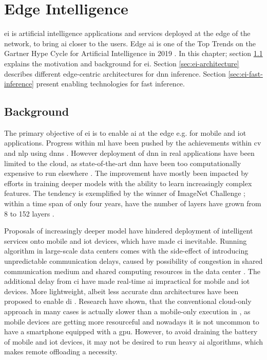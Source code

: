 \hypertarget{Edge Intelligence}{%
	\chapter{Edge Intelligence}\label{ch:edgeintelligence}}

\acrlong{ei} is artificial intelligence applications and services deployed at the edge of the network, to bring \gls{ai} closer to the users. Edge \gls{ai} is one of the Top Trends on the Gartner Hype Cycle for Artificial Intelligence in 2019 \cite{goasduff_top_2019}. In this chapter; section \ref{sec:ei-background} explains the motivation and background for \gls{ei}. Section \ref{sec:ei-architecture} describes different edge-centric architectures for \gls{dnn} inference. Section \ref{sec:ei-fast-inference} present enabling technologies for fast inference.

\section{Background}\label{sec:ei-background}

The primary objective of \gls{ei} is to enable \gls{ai} at the edge e.g. for mobile and \gls{iot} applications. Progress within \gls{ml} have been pushed by the achievements within \gls{cv} and \gls{nlp} using \gls{dnn}s \cite{stoica_berkeley_2017}. However deployment of \gls{dnn} in real applications have been limited to the cloud, as state-of-the-art \gls{dnn} have been too computationally expensive to run elsewhere \cite{zhou_edge_2019}. The improvement have mostly been impacted by efforts in training deeper models with the ability to learn increasingly complex features. The tendency is exemplified by the winner of ImageNet Challenge ; within a time span of only four years, have the number of layers have grown from 8 to 152 layers \cite{russakovsky_imagenet_2015}. 

Proposals of increasingly deeper model have hindered deployment of intelligent services onto mobile and \gls{iot} devices, which have made \gls{ci} inevitable. Running algorithm in large-scale data centers comes with the side-effect of introducing unpredictable communication delays, caused by possibility of congestion in shared communication medium and shared computing resources in the data center \cite{shi_edge_2016}. The additional delay from \gls{ci} have made real-time \gls{ai} impractical for mobile and \gls{iot} devices. More lightweight, albeit less accurate \gls{dnn} architectures have been proposed to enable \gls{di} \cite{chen_deep_2019}. Research have shown, that the conventional cloud-only approach in many cases is actually slower than a mobile-only execution in \cite{kang_neurosurgeon:_2017}, as mobile devices are getting more resourceful and nowadays it is not uncommon to have a smartphone equipped with a \gls{gpu}. However, to avoid draining the battery of mobile and \gls{iot} devices, it may not be desired to run heavy \gls{ai} algorithms, which makes remote offloading a necessity. 


